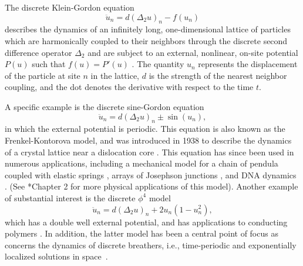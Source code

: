 \documentclass[12pt,reqno]{amsart}
\begin{document}
The discrete Klein-Gordon equation
\begin{equation*}
\ddot{u}_n = d (\Delta_2 u)_n - f(u_n)
\end{equation*}
describes the dynamics of an infinitely long, one-dimensional lattice of particles which are harmonically coupled to their neighbors through the discrete second difference operator $\Delta_2$ and are subject to an external, nonlinear, on-site potential $P(u)$ such that $f(u) = P'(u)$ \cite{Karachalios}. The quantity $u_n$ represents the displacement of the particle at site $n$ in the lattice, $d$ is the strength of the nearest neighbor coupling, and the dot denotes the derivative with respect to the time $t$. 

A specific example is the discrete sine-Gordon equation
\begin{equation}\label{eq:dSG}
	\ddot{u}_n = d (\Delta_2 u)_n \pm \sin(u_n),
\end{equation}
in which the external potential is periodic. This equation is also known as the Frenkel-Kontorova model, and was introduced in 1938 to describe the dynamics of a crystal lattice near a dislocation core \cites{braun1998,braun2004}. This equation has since been used in numerous applications, including a mechanical model for a chain of pendula coupled with elastic springs \cites{Scott1969,english}, arrays of Josephson junctions \cites{Ustinov1992,Floria1998}, and DNA dynamics \cites{Yomosa1983,Yakushevich1998,DeLeo2011}. (See \cite{braun2004}*{Chapter 2} for more physical applications of this model). Another example of  substantial interest is the discrete $\phi^4$ model
\begin{equation}\label{eq:dphi4}
	\ddot{u}_n = d (\Delta_2 u)_n + 2 u_n(1 - u_n^2),
\end{equation}
which has a double well external potential, and has applications to conducting polymers \cite{heeger1988}. In addition, the
latter model has been a central point of focus
as concerns the dynamics of discrete 
breathers, i.e., time-periodic and exponentially localized solutions in space~\cites{tsironis,FLACH20081}.
\end{document}
